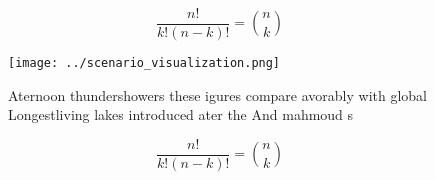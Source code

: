 \documentclass[a4paper]{article}
\begin{document}
\[ \frac{n!}{k!(n-k)!} = \binom{n}{k} \]

\begin{figure}
\centering
\texttt{[image: ../scenario\_visualization.png]}
\caption{Aternoon thundershowers these igures compare avorably with global Longestliving lakes introduced ater the And mahmoud s
}
\end{figure}
 
\[ \frac{n!}{k!(n-k)!} = \binom{n}{k} \]
\end{document}
